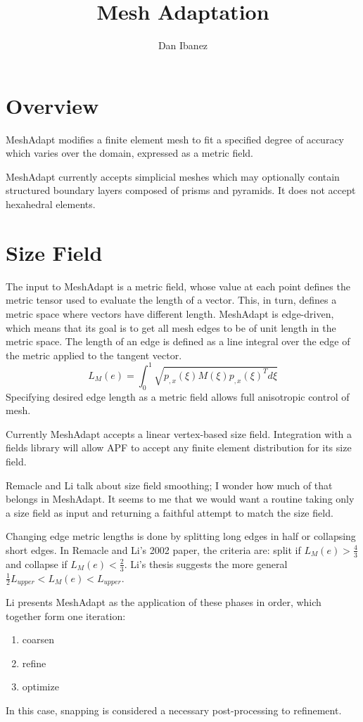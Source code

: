 \documentclass{article}
\title{Mesh Adaptation}
\author{Dan Ibanez}
\begin{document}
\maketitle

\section{Overview}

MeshAdapt modifies a finite element mesh to fit
a specified degree of accuracy which varies over
the domain, expressed as a metric field.

MeshAdapt currently accepts simplicial meshes
which may optionally contain structured boundary
layers composed of prisms and pyramids.
It does not accept hexahedral elements.

\section{Size Field}

The input to MeshAdapt is a metric field, whose value
at each point defines the metric tensor used to
evaluate the length of a vector.
This, in turn, defines a metric space where vectors
have different length.
MeshAdapt is edge-driven, which means that its goal
is to get all mesh edges to be of unit length
in the metric space.
The length of an edge is defined as a line integral
over the edge of the metric applied to the tangent
vector.
\[L_M(e)=\int_0^1\sqrt{p_{,x}(\xi)M(\xi)p_{,x}(\xi)^Td\xi}\]
Specifying desired edge length as a metric field
allows full anisotropic control of mesh.

Currently MeshAdapt accepts a linear vertex-based
size field.
Integration with a fields library will allow APF
to accept any finite element distribution for its
size field. 

Remacle and Li talk about size field smoothing;
I wonder how much of that belongs in MeshAdapt.
It seems to me that we would want a routine
taking only a size field as input and returning
a faithful attempt to match the size field.

Changing edge metric lengths is done by splitting
long edges in half or collapsing short edges.
In Remacle and Li's 2002 paper, the criteria are:
split if $L_M(e) > \frac43$ and collapse if
$L_M(e)<\frac23$.
Li's thesis suggests the more general
$\frac12L_{upper} < L_M(e) < L_{upper}$.

Li presents MeshAdapt as the application of these
phases in order, which together form one iteration:
\begin{enumerate}
\item coarsen
\item refine
\item optimize
\end{enumerate}
In this case, snapping is considered a necessary
post-processing to refinement.
\end{document}
